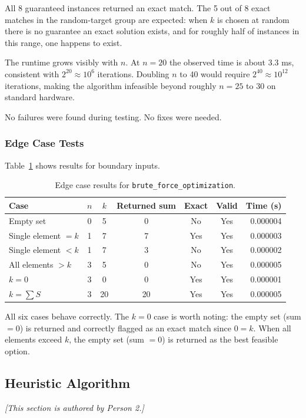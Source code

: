 \documentclass[12pt,a4paper]{article}
\theoremstyle{definition}
\begin{document}
All 8 guaranteed instances returned an exact match. The 5 out of 8 exact
matches in the random-target group are expected: when $k$ is chosen at random
there is no guarantee an exact solution exists, and for roughly half of
instances in this range, one happens to exist.

The runtime grows visibly with $n$. At $n = 20$ the observed time is about
3.3 ms, consistent with $2^{20} \approx 10^6$ iterations. Doubling $n$ to 40
would require $2^{40} \approx 10^{12}$ iterations, making the algorithm
infeasible beyond roughly $n = 25$ to $30$ on standard hardware.

No failures were found during testing. No fixes were needed.

\subsubsection*{Edge Case Tests}

Table~\ref{tab:edge} shows results for boundary inputs.

\begin{table}[h!]
  \centering
  \renewcommand{\arraystretch}{1.3}
  \begin{tabular}{lcccccr}
    \toprule
    Case & $n$ & $k$ & Returned sum & Exact & Valid & Time (s) \\
    \midrule
    Empty set            & 0 & 5  & 0  & No  & Yes & 0.000004 \\
    Single element $= k$ & 1 & 7  & 7  & Yes & Yes & 0.000003 \\
    Single element $< k$ & 1 & 7  & 3  & No  & Yes & 0.000002 \\
    All elements $> k$   & 3 & 5  & 0  & No  & Yes & 0.000005 \\
    $k = 0$              & 3 & 0  & 0  & Yes & Yes & 0.000001 \\
    $k = \sum S$         & 3 & 20 & 20 & Yes & Yes & 0.000005 \\
    \bottomrule
  \end{tabular}
  \caption{Edge case results for \texttt{brute\_force\_optimization}.}
  \label{tab:edge}
\end{table}

All six cases behave correctly. The $k = 0$ case is worth noting: the empty
set (sum $= 0$) is returned and correctly flagged as an exact match since
$0 = k$. When all elements exceed $k$, the empty set (sum $= 0$) is returned
as the best feasible option.

\subsection{Heuristic Algorithm}
\textit{[This section is authored by Person 2.]}
\end{document}

